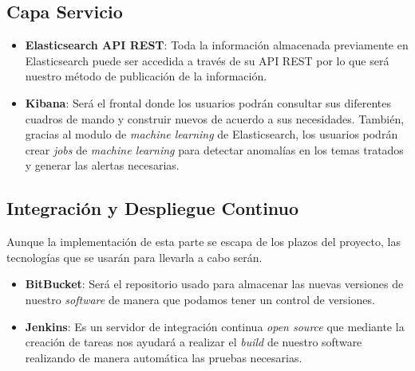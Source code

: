 \subsection{Capa Servicio}
\begin{itemize}
	\item \textbf{Elasticsearch API REST}: Toda la información almacenada previamente en Elasticsearch puede ser accedida a través de su API REST por lo que será nuestro método de publicación de la información. 
	\item \textbf{Kibana}: Será el frontal donde los usuarios podrán consultar sus diferentes cuadros de mando y construir nuevos de acuerdo a sus necesidades. También, gracias al modulo de \textit{machine learning} de Elasticsearch, los usuarios podrán crear \textit{jobs} de \textit{machine learning} para detectar anomalías en los temas tratados y generar las alertas necesarias.
\end{itemize}


\subsection{Integración y Despliegue Continuo}
Aunque la implementación de esta parte se escapa de los plazos del proyecto, las tecnologías que se usarán para llevarla a cabo serán. 
\begin{itemize}
	\item \textbf{BitBucket}: Será el repositorio usado para almacenar las nuevas versiones de nuestro \textit{software} de manera que podamos tener un control de versiones.
	\item \textbf{Jenkins}: Es un servidor de integración continua \textit{open source}  que mediante la creación de tareas nos ayudará a realizar el \textit{build} de nuestro software realizando de manera automática las pruebas necesarias.
\end{itemize}